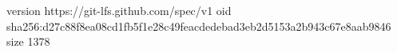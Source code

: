 version https://git-lfs.github.com/spec/v1
oid sha256:d27c88f8ea08cd1fb5f1e28c49feacdedebad3eb2d5153a2b943c67e8aab9846
size 1378
